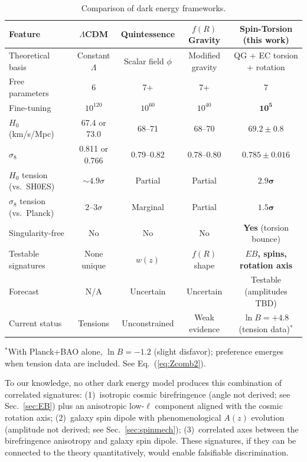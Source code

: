 \documentclass[aps,prd,twocolumn,superscriptaddress,showpacs,preprintnumbers,nofootinbib,longbibliography,floatfix]{revtex4-2}
\begin{document}
\begin{table}[t]
\caption{\label{tab:fullcomp} Comparison of dark energy frameworks.}
\begin{ruledtabular}
\begin{tabular}{lcccc}
Feature & $\Lambda$CDM & Quintessence & $f(R)$ Gravity & \textbf{Spin-Torsion (this work)} \\
\hline
Theoretical basis & Constant $\Lambda$ & Scalar field $\phi$ & Modified gravity & QG + EC torsion + rotation \\
Free parameters & 6 & 7+ & 7+ & 7 \\
Fine-tuning & $10^{120}$ & $10^{60}$ & $10^{40}$ & $\mathbf{10^{5}}$ \\
$H_0$ (km/s/Mpc) & 67.4 or 73.0 & 68--71 & 68--70 & $\mathbf{69.2\pm 0.8}$ \\
$\sigma_8$ & 0.811 or 0.766 & 0.79--0.82 & 0.78--0.80 & $\mathbf{0.785\pm 0.016}$ \\
$H_0$ tension (vs.\ SH0ES) & ${\sim}4.9\sigma$ & Partial & Partial & $\mathbf{2.9\sigma}$ \\
$\sigma_8$ tension (vs.\ Planck) & $2$--$3\sigma$ & Marginal & Partial & $\mathbf{1.5\sigma}$ \\
Singularity-free & No & No & No & \textbf{Yes} (torsion bounce) \\
Testable signatures & None unique & $w(z)$ & $f(R)$ shape & \textbf{$EB$, spins, rotation axis} \\
Forecast & N/A & Uncertain & Uncertain & Testable (amplitudes TBD) \\
Current status & Tensions & Unconstrained & Weak evidence & $\ln B = +4.8$ (tension data)$^*$ \\
\end{tabular}
\end{ruledtabular}
\vspace{2pt}
{\small $^*$With Planck+BAO alone, $\ln B = -1.2$ (slight disfavor); preference emerges when tension data are included. See Eq.~(\ref{eq:Zcomb2}).}
\end{table}

To our knowledge, no other dark energy model produces this combination of correlated signatures: (1)~isotropic cosmic birefringence (angle not derived; see Sec.~\ref{sec:EB}) plus an anisotropic low-$\ell$ component aligned with the cosmic rotation axis; (2)~galaxy spin dipole with phenomenological $A(z)$ evolution (amplitude not derived; see Sec.~\ref{sec:spinmech}); (3)~correlated axes between the birefringence anisotropy and galaxy spin dipole. These signatures, if they can be connected to the theory quantitatively, would enable falsifiable discrimination.
\end{document}
